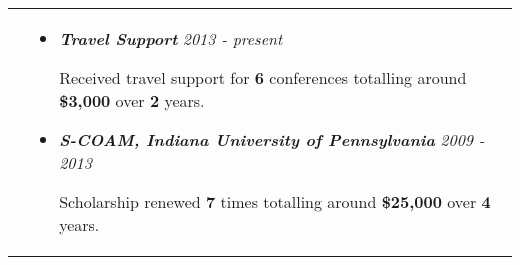 \documentclass[10pt]{article}
\begin{document}
\vspace*{-\baselineskip}
\hskip-1.7in
\begin{tabularx}{1.5\linewidth}{>{\raggedleft\scshape}p{3cm}X}

  &\begin{itemize}
    \setlength\itemsep{.005em}  
          
\item \textbf{\textit{Travel Support}} \hspace{98.5 mm}\textit{2013 - present}
  
            Received travel support for \textbf{6} conferences totalling around \textbf{\$3,000} over \textbf{2} years.
                      
          
\item \textbf{\textit{S-COAM, Indiana University of Pennsylvania}} \hspace{42 mm}\textit{2009 - 2013}
  
            Scholarship renewed \textbf{7} times totalling around \textbf{\$25,000} over \textbf{4} years.
            

  \end{itemize} 

\end{tabularx}
\end{document}
